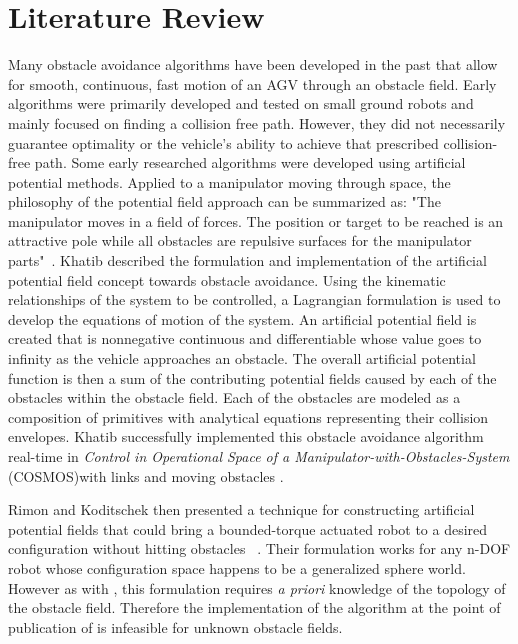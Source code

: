 \documentclass[12pt,onecolumn]{report}
\begin{document}

\section{Literature Review}\label{s:LiteratureReview}

Many obstacle avoidance algorithms have been developed in the past that allow for smooth, continuous, fast motion of an AGV through an obstacle field. Early algorithms were primarily developed and tested on small ground robots and mainly focused on finding a collision free path. However, they did not necessarily guarantee optimality or the vehicle's ability to achieve that prescribed collision-free path. Some early researched algorithms were developed using artificial potential methods. Applied to a manipulator moving through space, the philosophy of the potential field approach can be summarized as: "The manipulator moves in a field of forces. The position or target to be reached is an attractive pole while all obstacles are repulsive surfaces for the manipulator parts"~\cite{Khatib1986}. Khatib described the formulation and implementation of the artificial potential field concept towards obstacle avoidance. Using the kinematic relationships of the system to be controlled, a Lagrangian formulation is used to develop the equations of motion of the system. An artificial potential field is created that is nonnegative continuous and differentiable whose value goes to infinity as the vehicle approaches an obstacle. The overall artificial potential function is then a sum of the contributing potential fields caused by each of the obstacles within the obstacle field. Each of the obstacles are modeled as a composition of primitives with analytical equations representing their collision envelopes. Khatib successfully implemented this obstacle avoidance algorithm real-time in \textit{Control in Operational Space of a Manipulator-with-Obstacles-System} (COSMOS)with links and moving obstacles \cite{Khatib1986}. 

Rimon and Koditschek then presented a technique for constructing artificial potential fields that could bring a bounded-torque actuated robot to a desired configuration without hitting obstacles ~\cite{Rimon&Koditschek1992}. Their formulation works for any n-DOF robot whose configuration space happens to be a generalized sphere world. However as with \cite{Khatib1986}, this formulation requires \textit{a priori} knowledge of the topology of the obstacle field. Therefore the implementation of the algorithm at the point of publication of \cite{Rimon&Koditschek1992} is infeasible for unknown obstacle fields. 
\end{document}
